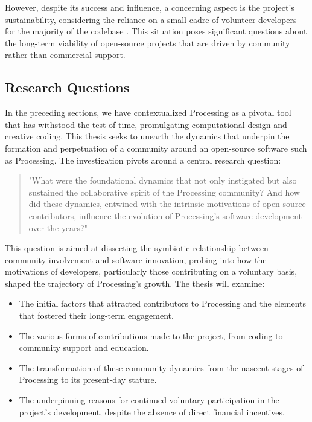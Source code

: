 However, despite its success and influence, a concerning aspect is the project's sustainability, considering the reliance on a small cadre of volunteer developers for the majority of the codebase \parencite{fryModernPrometheusHistory2018}. This situation poses significant questions about the long-term viability of open-source projects that are driven by community rather than commercial support.

\subsection{Research Questions}

In the preceding sections, we have contextualized Processing as a pivotal tool that has withstood the test of time, promulgating computational design and creative coding. This thesis seeks to unearth the dynamics that underpin the formation and perpetuation of a community around an open-source software such as Processing. The investigation pivots around a central research question:

\begin{quote}
"What were the foundational dynamics that not only instigated but also sustained the collaborative spirit of the Processing community? And how did these dynamics, entwined with the intrinsic motivations of open-source contributors, influence the evolution of Processing's software development over the years?"
\end{quote}

This question is aimed at dissecting the symbiotic relationship between community involvement and software innovation, probing into how the motivations of developers, particularly those contributing on a voluntary basis, shaped the trajectory of Processing's growth. The thesis will examine:

\begin{itemize}
  \item The initial factors that attracted contributors to Processing and the elements that fostered their long-term engagement.
  \item The various forms of contributions made to the project, from coding to community support and education.
  \item The transformation of these community dynamics from the nascent stages of Processing to its present-day stature.
  \item The underpinning reasons for continued voluntary participation in the project's development, despite the absence of direct financial incentives.
\end{itemize}

